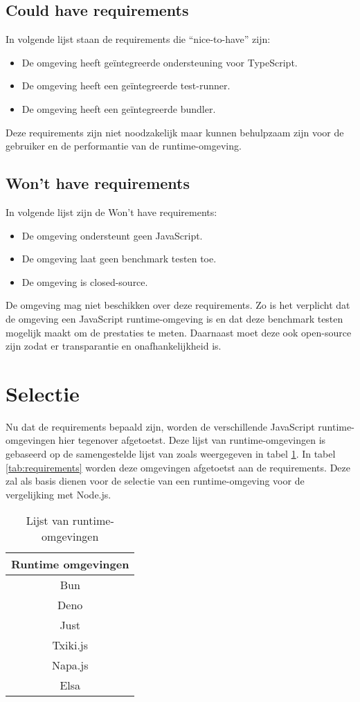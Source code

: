 \subsection{Could have requirements}
In volgende lijst staan de requirements die “nice-to-have” zijn:
\begin{itemize}
    \item De omgeving heeft geïntegreerde ondersteuning voor TypeScript.
    \item De omgeving heeft een geïntegreerde test-runner.
    \item De omgeving heeft een geïntegreerde bundler.
\end{itemize}
Deze requirements zijn niet noodzakelijk maar kunnen behulpzaam zijn voor de gebruiker en de performantie van de runtime-omgeving.

\subsection{Won't have requirements}
In volgende lijst zijn de Won't have requirements:
\begin{itemize}
    \item De omgeving ondersteunt geen JavaScript.
    \item De omgeving laat geen benchmark testen toe. 
    \item De omgeving is closed-source.
\end{itemize}
De omgeving mag niet beschikken over deze requirements. 
Zo is het verplicht dat de omgeving een JavaScript runtime-omgeving is en dat deze benchmark testen mogelijk maakt om de prestaties te meten.
Daarnaast moet deze ook open-source zijn zodat er transparantie en onafhankelijkheid is.

\section{Selectie}
Nu dat de requirements bepaald zijn, worden de verschillende JavaScript runtime-omgevingen hier tegenover afgetoetst.
Deze lijst van runtime-omgevingen is gebaseerd op de samengestelde lijst van \textcite{Errilaz2023} 
zoals weergegeven in tabel \ref{tab:omgevingen}.
In tabel \ref{tab:requirements} worden deze omgevingen afgetoetst aan de requirements. 
Deze zal als basis dienen voor de selectie van een runtime-omgeving voor de vergelijking met Node.js.
\begin{table}[H]
    \begin{tabular}{|c|}
    \hline
    \textbf{Runtime omgevingen} \\ \hline
    Bun                         \\
    Deno                        \\
    Just                        \\
    Txiki.js                    \\
    Napa.js                     \\
    Elsa                        \\ \hline
    \end{tabular}
    \caption[Lijst runtime-omgevingen]{\label{tab:omgevingen}Lijst van runtime-omgevingen}
\end{table}



